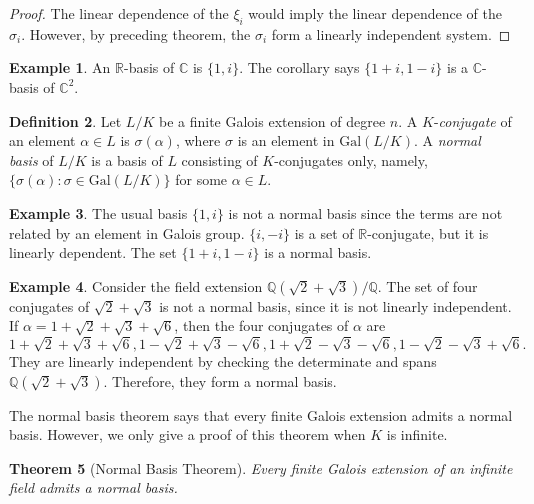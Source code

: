 \documentclass[12pt]{report}
\newtheorem{theorem}{Theorem}[section]
\theoremstyle{definition}
\newtheorem{definition}[theorem]{Definition}
\newtheorem{example}[theorem]{Example}
\newcommand{\Gal}{\text{Gal}}
\newcommand{\CC}{\mathbb{C}}
\newcommand{\QQ}{\mathbb{Q}}
\newcommand{\RR}{\mathbb{R}}
\begin{document}
\begin{proof}
	The linear dependence of the $\xi_i$ would imply the linear dependence of the $\sigma_i$. However, by preceding theorem, the $\sigma_i$ form a linearly independent system.
\end{proof}

\begin{example}
	An $\RR$-basis of $\CC$ is $\{1,i\}$. The corollary says $\{1+i, 1-i\}$ is a $\CC$-basis of $\CC^2$.
\end{example}


\begin{definition}
	Let $L/K$ be a finite Galois extension of degree $n$. A $K$-\emph{conjugate} of an element $\alpha\in L$ is $\sigma(\alpha)$, where $\sigma$ is an element in $\Gal(L/K)$. A \emph{normal basis} of $L/K$ is a basis of $L$ consisting of $K$-conjugates only, namely,  $\{\sigma(\alpha):\sigma\in \Gal(L/K)\}$ for some $\alpha\in L$.
\end{definition}

\begin{example}
	The usual basis $\{1,i\}$ is not a normal basis since the terms are not related by an element in Galois group. $\{i,-i\}$ is a set of $\RR$-conjugate, but it is linearly dependent. The set $\{1+i,1-i\}$ is a normal basis.
\end{example}

\begin{example}
	Consider the field extension $\QQ(\sqrt{2}+\sqrt{3})/\QQ$. The set of four conjugates of $\sqrt{2}+\sqrt{3}$ is not a normal basis, since it is not linearly independent. If $\alpha=1+\sqrt{2}+\sqrt{3}+\sqrt{6}$, then the four conjugates of $\alpha$ are
	$$1+\sqrt{2}+\sqrt{3}+\sqrt{6},1-\sqrt{2}+\sqrt{3}-\sqrt{6},1+\sqrt{2}-\sqrt{3}-\sqrt{6},1-\sqrt{2}-\sqrt{3}+\sqrt{6}.$$ They are linearly independent by checking the determinate and spans $\QQ(\sqrt{2}+\sqrt{3})$. Therefore, they form a normal basis.
\end{example}

The normal basis theorem says that every finite Galois extension admits a normal basis. However, we only give a proof of this theorem when $K$ is infinite.

\begin{theorem}[Normal Basis Theorem]
	Every finite Galois extension of an infinite field admits a normal basis.
\end{theorem}
\end{document}

